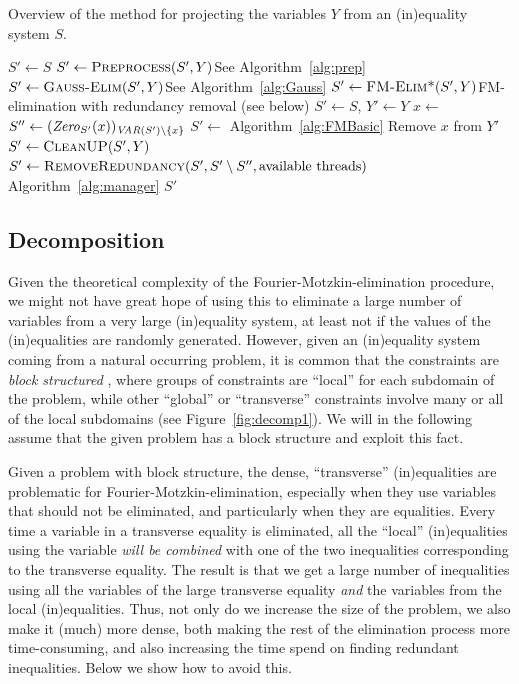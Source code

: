 \begin{algorithm}\caption{Overview of the method for projecting the variables $Y$ from an (in)equality system  $S$.}\label{alg:project}
\begin{algorithmic}[1]
	\State $S'\gets S$
	\State $S'\gets\Call{Preprocess}{S',Y}$\Comment See Algorithm~\ref{alg:prep}
	\State $S'\gets\Call{Gauss-Elim}{S',Y}$\Comment See Algorithm~\ref{alg:Gauss} 
	\State $S'\gets \Call{FM-Elim*}{S',Y}$\Comment FM-elimination with redundancy removal (see below)
\EndFunction
\Statex
{}
	\State  $S'\gets S$, $Y'\gets Y$
		\State $x\gets$ 
		\State $S''\gets(\mathit{Zero}_{S'}(x))_{\mathit{VAR}(S')\setminus\{x\}}$
		\State $S' \gets$  \Comment Algorithm~\ref{alg:FMBasic}
		\State Remove $x$ from $Y'$
		\State $S'\gets\Call{CleanUP}{S',Y}$
		\State $S'\gets \Call{RemoveRedundancy}{S', S'\setminus S'', \text{available threads}}$ 	\Comment Algorithm~\ref{alg:manager}\label{ln:projx}
	\EndWhile
	\State \Return $S'$
\EndFunction
\end{algorithmic}
\end{algorithm}
%
\subsection{Decomposition}\label{sec:decomp}
Given the theoretical complexity of the Fourier\--Motzkin\--elimination procedure, we might not have great hope of using this to eliminate a large number of variables from a very large (in)equality system, at least not if the values of the (in)equalities are randomly generated.
%
However, given an (in)equality system coming from a natural occurring problem, it is common that the constraints are \emph{block structured} \cite{williams}, where groups of constraints are ``local'' for each subdomain of the problem, while other ``global'' or ``transverse'' constraints involve many or all of the local subdomains (see Figure~\ref{fig:decomp1}). We will in the following assume that the given problem has a block structure and exploit this fact. 

Given a problem with block structure, the dense, ``transverse'' (in)equalities are problematic for Fourier-Motzkin-elimination, especially when they use variables that should not be eliminated, and particularly when they are equalities. 
Every time a variable in a transverse equality is eliminated, all the ``local'' (in)equalities using the variable \emph{will be combined} with one of the two inequalities corresponding to the transverse equality. The result is that we get a large number of inequalities using all the variables of the large transverse equality \emph{and} the variables from the local (in)equalities. Thus, not only do we increase the size of the problem, we also make it (much) more dense, both making the rest of the elimination process more time-consuming, and also increasing the time spend on finding redundant inequalities.
%
{Below we show how to avoid this.}

